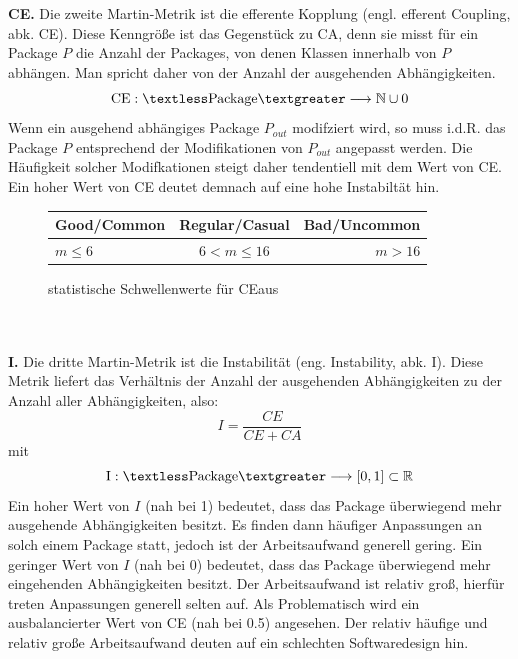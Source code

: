 \documentclass[12pt]{article}
\begin{document}
~\\
\\
\textbf{CE.}\label{CE} Die zweite Martin-Metrik ist die efferente
Kopplung (engl.  efferent Coupling, abk. CE).  Diese Kenngröße
ist das Gegenstück zu CA, denn sie misst für ein Package $P$ die
Anzahl der Packages, von denen Klassen innerhalb von $P$
abhängen. Man spricht daher von der Anzahl der ausgehenden
Abhängigkeiten.
\[
        \text{CE}: \textless \text{Package} \textgreater \longrightarrow \mathbb{N} \cup 0
\]
Wenn ein ausgehend abhängiges Package $P_{out}$ modifziert wird,
so muss i.d.R. das Package $P$ entsprechend der Modifikationen
von $P_{out}$ angepasst werden. Die Häufigkeit solcher
Modifkationen steigt daher tendentiell mit dem Wert
von CE. Ein hoher Wert von CE deutet demnach auf eine hohe
Instabiltät hin.

\begin{figure}[H]
\centering
 \begin{tabular}{lcr}
    \toprule
    Good/Common & Regular/Casual & Bad/Uncommon \\
    \midrule
    $m \leq 6$ & $6 < m \leq 16$ & $m > 16$ \\
    \bottomrule
  \end{tabular}
  \caption[Caption for LOF]{statistische Schwellenwerte für
          CE\protect\footnotemark aus \cite{Fil15}}
  \label{tab:cethreshold}
\end{figure}

~\\
\\
\textbf{I.}\label{I} Die dritte Martin-Metrik ist die
Instabilität (eng. Instability, abk.  I). Diese Metrik liefert
das Verhältnis der Anzahl der ausgehenden Abhängigkeiten zu der
Anzahl aller Abhängigkeiten, also:
\[
        I = \frac{CE}{CE + CA}
\]
mit
\[
        \text{I}: \textless \text{Package} \textgreater
        \longrightarrow [0,1] \subset \mathbb{R}
\]
Ein hoher Wert von $I$ (nah bei 1) bedeutet, dass das Package
überwiegend mehr ausgehende Abhängigkeiten besitzt. Es finden
dann häufiger Anpassungen an solch einem Package statt, jedoch ist
der Arbeitsaufwand generell gering.  Ein geringer Wert von $I$
(nah bei 0) bedeutet, dass das Package überwiegend mehr
eingehenden Abhängigkeiten besitzt. Der Arbeitsaufwand ist
relativ groß, hierfür treten Anpassungen generell selten auf. Als
Problematisch wird ein ausbalancierter Wert von CE (nah bei 0.5)
angesehen. Der relativ häufige und relativ große Arbeitsaufwand deuten
auf ein schlechten Softwaredesign hin.
\end{document}
